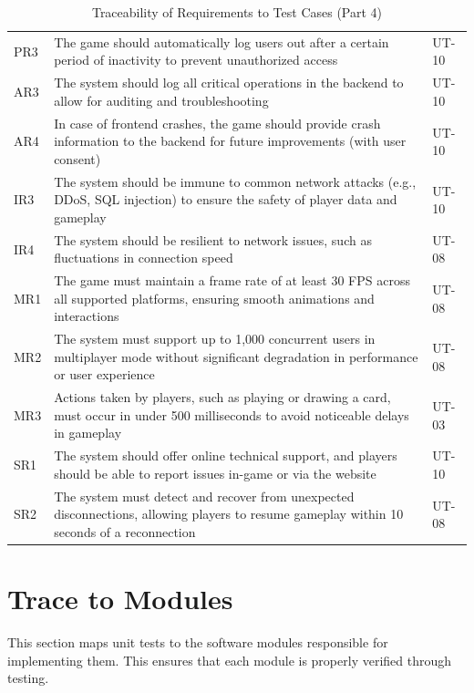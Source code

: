 \documentclass[12pt, titlepage]{article}
\begin{document}
\begin{table}[H]
    \centering
    \begin{tabularx}{\textwidth}{|l|X|l|}
        \hline
        PR3 & The game should automatically log users out after a certain period of inactivity to prevent unauthorized access & UT-10 \\
        AR3 & The system should log all critical operations in the backend to allow for auditing and troubleshooting & UT-10 \\
        AR4 & In case of frontend crashes, the game should provide crash information to the backend for future improvements (with user consent) & UT-10 \\
        IR3 & The system should be immune to common network attacks (e.g., DDoS, SQL injection) to ensure the safety of player data and gameplay & UT-10 \\
        IR4 & The system should be resilient to network issues, such as fluctuations in connection speed & UT-08 \\
        MR1 & The game must maintain a frame rate of at least 30 FPS across all supported platforms, ensuring smooth animations and interactions & UT-08 \\
        MR2 & The system must support up to 1,000 concurrent users in multiplayer mode without significant degradation in performance or user experience & UT-08 \\
        MR3 & Actions taken by players, such as playing or drawing a card, must occur in under 500 milliseconds to avoid noticeable delays in gameplay & UT-03 \\
        SR1 & The system should offer online technical support, and players should be able to report issues in-game or via the website & UT-10 \\
        SR2 & The system must detect and recover from unexpected disconnections, allowing players to resume gameplay within 10 seconds of a reconnection & UT-08 \\
        \hline
    \end{tabularx}
    \caption{Traceability of Requirements to Test Cases (Part 4)}
    \label{tab:trace_requirements_4}
\end{table}





\section{Trace to Modules}
This section maps unit tests to the software modules responsible for implementing them. This ensures that each module is properly verified through testing.
\end{document}
